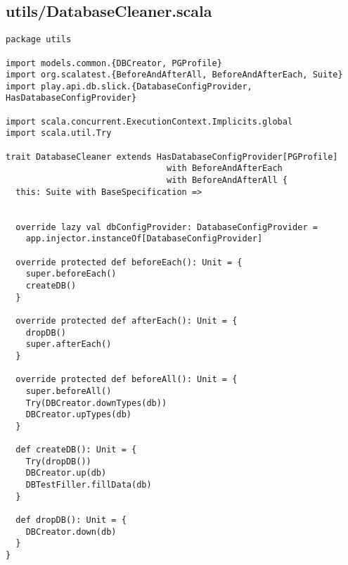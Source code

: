 \subsection{utils/DatabaseCleaner.scala}
\begin{lstlisting}
package utils

import models.common.{DBCreator, PGProfile}
import org.scalatest.{BeforeAndAfterAll, BeforeAndAfterEach, Suite}
import play.api.db.slick.{DatabaseConfigProvider, HasDatabaseConfigProvider}

import scala.concurrent.ExecutionContext.Implicits.global
import scala.util.Try

trait DatabaseCleaner extends HasDatabaseConfigProvider[PGProfile]
                                with BeforeAndAfterEach
                                with BeforeAndAfterAll {
  this: Suite with BaseSpecification =>


  override lazy val dbConfigProvider: DatabaseConfigProvider =
    app.injector.instanceOf[DatabaseConfigProvider]

  override protected def beforeEach(): Unit = {
    super.beforeEach()
    createDB()
  }

  override protected def afterEach(): Unit = {
    dropDB()
    super.afterEach()
  }

  override protected def beforeAll(): Unit = {
    super.beforeAll()
    Try(DBCreator.downTypes(db))
    DBCreator.upTypes(db)
  }

  def createDB(): Unit = {
    Try(dropDB())
    DBCreator.up(db)
    DBTestFiller.fillData(db)
  }

  def dropDB(): Unit = {
    DBCreator.down(db)
  }
}
\end{lstlisting}

